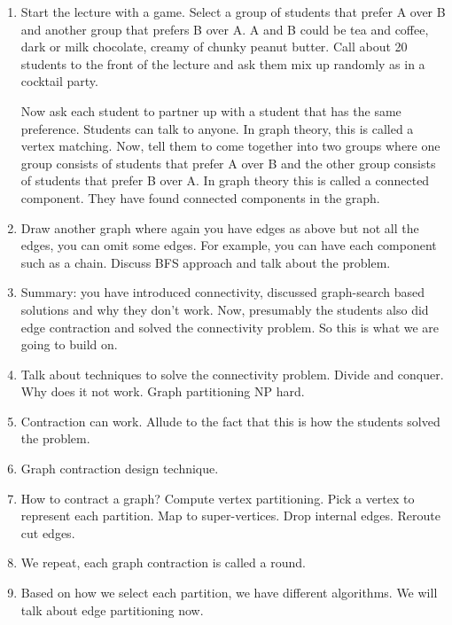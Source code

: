 {\begin{notesonly}
\begin{enumerate}
\item 
Start the lecture with a game. Select a group of students that prefer
A over B and another group that prefers B over A.
%
A and B could be tea and coffee, dark or milk chocolate, creamy of
chunky peanut butter. 
%
Call about 20 students to the front of the lecture and ask them mix up
randomly as in a cocktail party.

%
Now ask each student to partner up with a student that has the same
preference.  Students can talk to anyone.
%
In graph theory, this is called a vertex matching.
%
Now, tell them to come together into two groups where one group
consists of students that prefer A over B and the other group consists
of students that prefer B over A. 
%
In graph theory this is called a connected component.  They have found
connected components in the graph.


\item Draw another graph where again you have edges as above but not
  all the edges, you can omit some edges.  For example, you can have
  each component such as a chain. Discuss BFS approach and talk about
  the problem.

\item Summary: you have introduced connectivity, discussed
  graph-search based solutions and why they don't work.  Now,
  presumably the students also did edge contraction and solved the
  connectivity problem.  So this is what we are going to build on.


\item Talk about techniques to solve the connectivity problem.  Divide
  and conquer. Why does it not work. Graph partitioning NP hard.

\item Contraction can work.  Allude to the fact that this is how the
  students solved the problem.  

\item Graph contraction design technique.

\item How to contract a graph? Compute vertex partitioning.  Pick a
  vertex to represent each partition.  Map to super-vertices.  Drop
  internal edges. Reroute cut edges.


\item We repeat, each graph contraction is called a round.

\item Based on how we select each partition, we have different
  algorithms. We will talk about edge partitioning now.



\end{enumerate}
\end{notesonly}}
